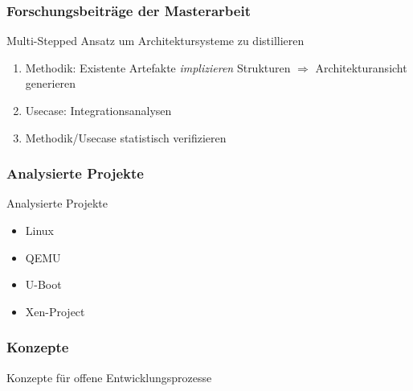 \documentclass{beamer}
\begin{document}
	\begin{frame}
	\frametitle{Forschungsbeiträge der Masterarbeit}
		\begin{alertblock}{Multi-Stepped Ansatz um Architektursysteme zu distillieren}
			\begin{enumerate}	
				\item Methodik: Existente Artefakte \textit{implizieren} Strukturen $\Rightarrow$ Architekturansicht generieren
				\item Usecase: Integrationsanalysen
				\item Methodik/Usecase statistisch verifizieren
			\end{enumerate}
		\end{alertblock}
	\end{frame}

	\begin{frame}
	\frametitle{Analysierte Projekte}
		\begin{block}{Analysierte Projekte}
			\begin{itemize}
				\item Linux
				\item QEMU
				\item U-Boot
				\item Xen-Project
			\end{itemize}
		\end{block}
	\end{frame}


	\begin{frame}
	\frametitle{Konzepte}
		\begin{center}
			\Huge Konzepte für offene Entwicklungsprozesse
		\end{center}
		
	\end{frame}

\end{document}
